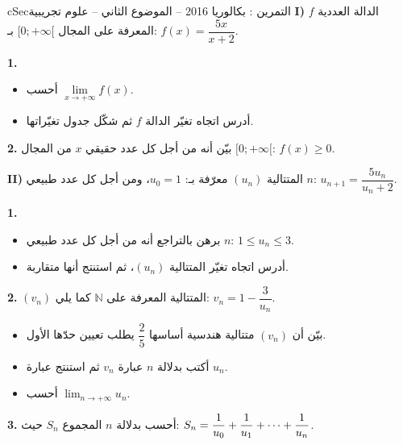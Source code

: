 \documentclass[12pt,a4paper]{article}
\newenvironment{BOX}[2]{\begin{otherlanguage}{english}\begin{arbox}{#1}{#2}}{\end{arbox}\end{otherlanguage}}
\newcounter{exo}
\newenvironment{tamrin}[1]{\stepcounter{exo}\begin{BOX}{cSec}{التمرين \theexo: #1}}{\end{BOX}}
\renewcommand{\cdots}{\mathinner{\cdotp\cdotp\cdotp}}
\newcommand{\N}{\mathbb{N}}
\newcommand{\limn}{\displaystyle\lim_{n\to+\infty}}
\newenvironment{sq}{\begin{itemize}[leftmargin=2.4em,itemsep=3pt]}{\end{itemize}}
\newcommand{\qa}{\item[(أ)]}\newcommand{\qb}{\item[(ب)]}\newcommand{\qc}{\item[(جـ)]}\newcommand{\qd}{\item[(د)]}\newcommand{\qe}{\item[(هـ)]}
\newcommand{\QQ}[1]{\par\smallskip\textbf{#1.} }
\begin{document}
\begin{tamrin}{بكالوريا 2016 -- الموضوع الثاني -- علوم تجريبية}
\textbf{I)} $f$ الدالة العددية المعرفة على المجال $[0;+\infty[$ بـ: $f(x)=\dfrac{5x}{x+2}$.
\QQ{1}
\begin{sq}
\qa أحسب $\lim\limits_{x\to+\infty}f(x)$.
\qb أدرس اتجاه تغيّر الدالة $f$ ثم شكّل جدول تغيّراتها.
\end{sq}
\QQ{2} بيّن أنه من أجل كل عدد حقيقي $x$ من المجال $[0;+\infty[$: $f(x)\geqslant 0$.

\textbf{II)} المتتالية $(u_n)$ معرّفة بـ: $u_0=1$، ومن أجل كل عدد طبيعي $n$: $u_{n+1}=\dfrac{5u_n}{u_n+2}$.
\QQ{1}
\begin{sq}
\qa برهن بالتراجع أنه من أجل كل عدد طبيعي $n$: $1\leqslant u_n\leqslant 3$.
\qb أدرس اتجاه تغيّر المتتالية $(u_n)$، ثم استنتج أنها متقاربة.
\end{sq}
\QQ{2} $(v_n)$ المتتالية المعرفة على $\N$ كما يلي: $v_n=1-\dfrac{3}{u_n}$.
\begin{sq}
\qa بيّن أن $(v_n)$ متتالية هندسية أساسها $\dfrac25$ يطلب تعيين حدّها الأول.
\qb أكتب بدلالة $n$ عبارة $v_n$ ثم استنتج عبارة $u_n$.
\qc أحسب $\limn u_n$.
\end{sq}
\QQ{3} أحسب بدلالة $n$ المجموع $S_n$ حيث: $S_n=\dfrac{1}{u_0}+\dfrac{1}{u_1}+\cdots+\dfrac{1}{u_n}$.
\end{tamrin}
\end{document}
